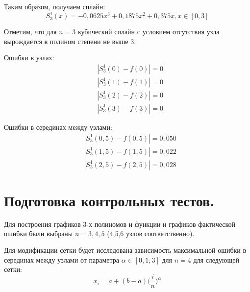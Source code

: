 \documentclass[a4paper, 12pt]{article}
\begin{document}
	Таким образом, получаем сплайн:
	\begin{equation*}
		S_3^1(x)=-0,0625x^3+0,1875x^2+0,375x, x\in[0,3]
	\end{equation*}
	
	Отметим, что для $n=3$ кубический сплайн с условием отсутствия узла вырождается в полином степени не выше 3.
	
	Ошибки в узлах:
	\begin{equation*}
		\begin{aligned}
			&|S_3^1(0)-f(0)|=0\\
			&|S_3^1(1)-f(1)|=0\\
			&|S_3^1(2)-f(2)|=0\\
			&|S_3^1(3)-f(3)|=0
		\end{aligned}
	\end{equation*}
	
	Ошибки в серединах между узлами:
	\begin{equation*}
		\begin{aligned}
			&|S_3^1(0,5)-f(0,5)|=0,050\\
			&|S_3^1(1,5)-f(1,5)|=0,022\\
			&|S_3^1(2,5)-f(2,5)|=0,028
		\end{aligned}
	\end{equation*}
	
	\section{Подготовка контрольных тестов.}
	
	Для построения графиков 3-х полиномов и функции и графиков фактической ошибки были выбраны $n=3,4,5$ (4,5,6 узлов соответственно).
	
	Для модификации сетки будет исследована зависимость максимальной ошибки в серединах между узлами от параметра $\alpha\in[0,1;3]$ для $n=4$ для следующей сетки:
	\begin{equation} \label{grid}
		x_i=a+(b-a)\bigg(\frac{i}{n}\bigg)^\alpha
	\end{equation}
	
\end{document}
